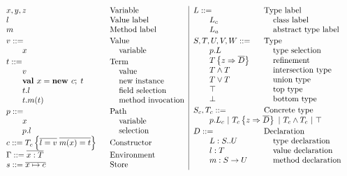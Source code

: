 \documentclass{llncs}
\newcommand{\gap}{\quad\quad}
\newcommand{\ba}{\begin{array}}
\newcommand{\ea}{\end{array}}
\newcommand{\typ}{:}
\newcommand{\tfun}{\rightarrow}
\newcommand{\tand}{\wedge}
\newcommand{\tor}{\vee}
\newcommand{\refine}[2]{\left\{#1 \Rightarrow #2 \right\}}
\newcommand{\ldefs}[1]{\left\{#1\right\}}
\newcommand{\seq}[1]{\overline{#1}}
\newcommand{\mapp}[3]{#1.#2(#3)}
\newcommand{\new}[3]{\textbf{val }#1 = \textbf{new }#2 ;\; #3}
\newcommand{\Ldecl}[3]{#1 : #2..#3}%
\newcommand{\ldecl}[2]{#1 : #2}
\newcommand{\mdecl}[3]{#1 : #2 \tfun #3}
\newcommand{\Top}{\top}%
\newcommand{\Bot}{\bot}%
\begin{document}
\begin{figure}
{$\ba{l@{\hspace{0.2mm}}|@{\hspace{0.2mm}}l}
\ba[t]{l@{\hspace{10mm}}l}
x, y, z    & \lindent{\mbox{Variable}} \\
l          & \lindent{\mbox{Value label}}\\
m          & \lindent{\mbox{Method label}}\\[0.2em]
v ::=      & \lindent{\mbox{Value}} \\
\gap x     & \mbox{variable} \\[0.2em]
t ::=      & \lindent{\mbox{Term}} \\
\gap v     & \mbox{value} \\
\gap \new x c t & \mbox{new instance} \\
\gap t.l  & \mbox{field selection} \\
\gap \mapp t m t  & \mbox{method invocation} \\[0.2em]
p ::= & \lindent \mbox{Path} \\
\gap x & \mbox{variable} \\
\gap p.l & \mbox{selection} \\
c ::= T_c \ldefs{\seq{l = v}\;\seq{m(x) = t}} & \lindent{\mbox{Constructor}} \\[0.2em]
\Gamma ::= \seq{x \typ T} & \lindent\mbox{Environment} \\
s      ::= \seq{x \mapsto c} & \lindent\mbox{Store} \\
\ea
&
\ba[t]{l@{\hspace{10mm}}l}
L ::=      & \lindent{\mbox{Type label}} \\
\gap L_c   & \mbox{class label} \\
\gap L_a   & \mbox{abstract type label} \\[0.2em]
S,T,U,V,W ::= & \lindent\mbox{Type}\\
\gap p.L & \mbox{type selection} \\
\gap T \refine z {\seq D} & \mbox{refinement} \\
\gap T \tand T & \mbox{intersection type} \\
\gap T \tor T & \mbox{union type} \\
\gap \Top  & \mbox{top type} \\
\gap \Bot  & \mbox{bottom type} \\[0.2em]
S_c, T_c ::= & \lindent \mbox{Concrete type} \\
\multicolumn{2}{l}{\gap p.L_c ~|~ T_c \refine z {\seq D} ~|~ T_c \wedge T_c  ~|~ \Top} \\[0.2em]
D ::= & \lindent\mbox{Declaration} \\
\gap \Ldecl L S U & \mbox{type declaration} \\
\gap \ldecl l T   & \mbox{value declaration} \\
\gap \mdecl m S U & \mbox{method declaration}
\ea
\ea$
\medskip

}
\end{figure}
\end{document}
